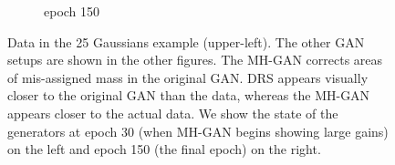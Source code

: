 \begin{figure}[htbp]
\begin{subfigure}[b]{0.49\textwidth}
       \caption{epoch 150}
    \end{subfigure}
    \caption{{\small
    Data in the 25 Gaussians example (upper-left)\@.
    The other GAN setups are shown in the other figures.
    The MH-GAN corrects areas of mis-assigned mass in the original GAN\@.
    DRS appears visually closer to the original GAN than the data, whereas the MH-GAN appears closer to the actual data.
    We show the state of the generators at epoch 30 (when MH-GAN begins showing large gains) on the left and epoch 150 (the final epoch) on the right.
    }}
    \label{fig:mog_example}
\end{figure}

